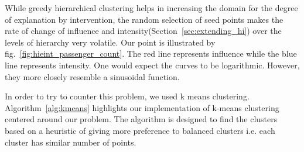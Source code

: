 






While greedy hierarchical clustering helps in increasing the domain for the degree of explanation by intervention, the random selection of seed points makes the rate of change of influence and intensity(Section~\ref{sec:extending_hi}) over the levels of hierarchy very volatile. Our point is illustrated by fig.~\ref{fig:hieint_passenger_count}. The red line represents influence while the blue line represents intensity. One would expect the curves to be logarithmic. However, they more closely resemble a sinusoidal function.


In order to try to counter this problem, we used k means clustering. Algorithm~\ref{alg:kmeans} highlights our implementation of k-means clustering centered around our problem. The algorithm is designed to find the clusters based on a heuristic of giving more preference to balanced clusters i.e. each cluster has similar number of points.

